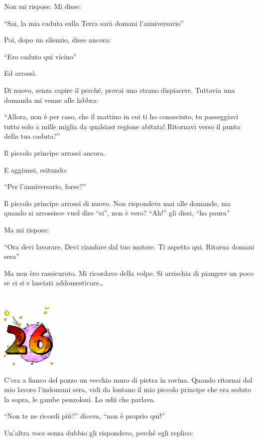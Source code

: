 \documentclass[11pt]{scrbook}
\begin{document}
Non mi rispose. Mi disse:

``Sai, la mia caduta sulla Terra sarà domani l'anniversario''

Poi, dopo un silenzio, disse ancora:

``Ero caduto qui vicino''

Ed arrossì.

Di nuovo, senza capire il perché, provai uno strano dispiacere. Tuttavia
una domanda mi venne alle labbra:

``Allora, non è per caso, che il mattino in cui ti ho conosciuto, tu
passeggiavi tutto solo a mille miglia da qualsiasi regione abitata!
Ritornavi verso il punto della tua caduta?''

Il piccolo principe arrossi ancora.

E aggiunsi, esitando:

``Per l'anniversario, forse?''

Il piccolo principe arrossi di nuovo. Non rispondeva mai alle domande,
ma quando si arrossisce vuol dire ``si'', non è vero? ``Ah!'' gli dissi,
``ho paura''

Ma mi rispose:

``Ora devi lavorare. Devi riandare dal tuo motore. Ti aspetto qui.
Ritorna domani sera''

Ma non èro rassicurato. Mi ricordavo della volpe. Si arrischia di
piangere un poco se ci si e lasciati addomesticare\ldots{}

\chapter{}
\begin{center}
\includegraphics{img/chapter26}
\end{center}

C'era a fianco del pozzo un vecchio muro di pietra in rovina. Quando
ritornai dal mio lavoro l'indomani sera, vidi da lontano il mio piccolo
principe che era seduto la sopra, le gambe penzoloni. Lo udii che
parlava.

``Non te ne ricordi più?'' diceva, ``non è proprio qui!''

Un'altra voce senza dubbio gli rispondevo, perché egli replico:
\end{document}
